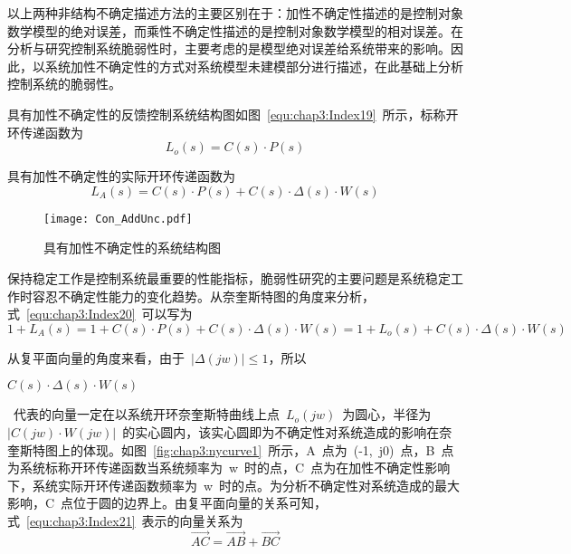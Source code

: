 以上两种非结构不确定描述方法的主要区别在于：加性不确定性描述的是控制对象数学模型的绝对误差，而乘性不确定性描述的是控制对象数学模型的相对误差。在分析与研究控制系统脆弱性时，主要考虑的是模型绝对误差给系统带来的影响。因此，以系统加性不确定性的方式对系统模型未建模部分进行描述，在此基础上分析控制系统的脆弱性。

具有加性不确定性的反馈控制系统结构图如图~\ref{equ:chap3:Index19}~所示，标称开环传递函数为
\begin{equation}\label{equ:chap3:Index19}
L_o\left(s\right)=C\left(s\right)\cdot P\left(s\right)
\end{equation}

具有加性不确定性的实际开环传递函数为
\begin{equation}\label{equ:chap3:Index20}
L_A\left(s\right)=C\left(s\right)\cdot P\left(s\right)+C\left(s\right)\cdot \Delta\left(s\right)\cdot W\left(s\right)
\end{equation}
\begin{figure}[h]
  \centering
     \texttt{[image: Con\_AddUnc.pdf]}\\
   \caption{具有加性不确定性的系统结构图}\label{fig:chap3:conaddunc}
\end{figure}

保持稳定工作是控制系统最重要的性能指标，脆弱性研究的主要问题是系统稳定工作时容忍不确定性能力的变化趋势。从奈奎斯特图的角度来分析，式~\ref{equ:chap3:Index20}~可以写为
\begin{equation}\label{equ:chap3:Index21}
1+L_A\left(s\right)=1+C\left(s\right)\cdot P\left(s\right)+C\left(s\right)\cdot \Delta\left(s\right)\cdot W\left(s\right)=1+L_o\left(s\right)+C\left(s\right)\cdot \Delta\left(s\right)\cdot W\left(s\right)
\end{equation}

从复平面向量的角度来看，由于~$\left\vert\Delta\left(jw\right)\right\vert\leq 1$，所以~\begin{small}$C\left(s\right)\cdot\Delta\left(s\right)\cdot W\left(s\right)$\end{small}~代表的向量一定在以系统开环奈奎斯特曲线上点~$L_o\left(jw\right)$~为圆心，半径为~$\left\vert C\left(jw\right)\cdot W\left(jw\right)\right\vert$~的实心圆内，该实心圆即为不确定性对系统造成的影响在奈奎斯特图上的体现。如图~\ref{fig:chap3:nycurve1}~所示，A~点为~(-1,~j0)~点，B~点为系统标称开环传递函数当系统频率为~w~时的点，C~点为在加性不确定性影响下，系统实际开环传递函数频率为~w~时的点。为分析不确定性对系统造成的最大影响，C~点位于圆的边界上。由复平面向量的关系可知，式~\ref{equ:chap3:Index21}~表示的向量关系为
\begin{equation}\label{equ:chap3:Index22}
\overrightarrow{AC}=\overrightarrow{AB}+\overrightarrow{BC}
\end{equation}

